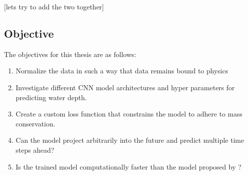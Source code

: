 [lets try to add the two together]
\subsection{Objective}
The objectives for this thesis are as follows:

\begin{enumerate}
	\item Normalize the data in such a way that data remains bound to physics \label{question1}
	\item Investigate different CNN model architectures and hyper parameters for predicting water depth. \label{qustion2} 
	\item Create a custom loss function that constrains the model to adhere to mass conservation. \label{question3}
	\item Can the model project arbitrarily into the future and predict multiple time steps ahead? \label{question4}
	\item Is the trained model computationally faster than the model proposed by \cite{Ghimire}? \label{question5}
\end{enumerate}
